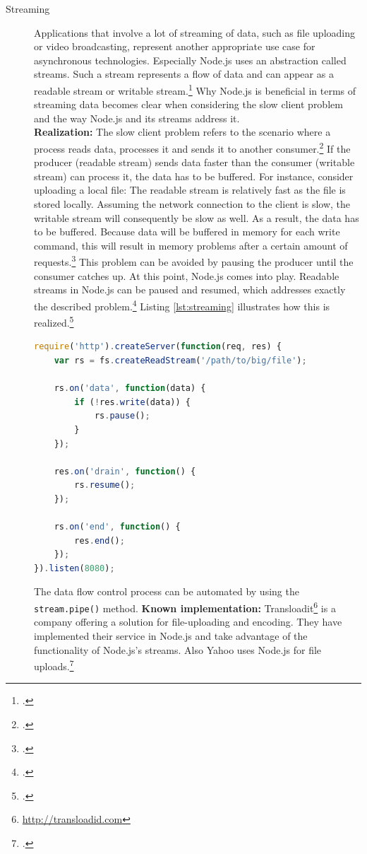 \begin{description}
   \item[Streaming] Applications that involve a lot of streaming of data, such
   as file uploading or video broadcasting, represent another appropriate use
   case for asynchronous technologies. Especially Node.js uses an abstraction
   called streams. Such a stream represents a flow of data and can appear as a
   readable stream or writable stream.\footcite[Cf.][75]{teixeira_2012} Why
   Node.js is beneficial in terms of streaming data becomes clear when
   considering the slow client problem and the way Node.js and its streams
   address it.\\
  \textbf{Realization:} The slow client problem refers to the scenario where a
  process reads data, processes it and sends it to another consumer.\footcite[Cf.][80]{teixeira_2012}
  If the producer (readable stream) sends data faster than the consumer (writable stream)
  can process it, the data has to be buffered. For instance, consider uploading
  a local file: The readable stream is relatively fast as the file is stored locally.
  Assuming the network connection to the client is slow, the writable stream will consequently
  be slow as well. As a result, the data has to be buffered. Because data will be buffered in
  memory for each write command, this will result in memory problems after a certain amount of
  requests.\footcite[Cf.][81]{teixeira_2012} This problem can be avoided by pausing the producer 
  until the consumer catches up. At this point, Node.js comes into play. Readable streams 
  in Node.js can be paused and resumed, which addresses exactly the described 
  problem.\footcite[Cf.][81]{teixeira_2012} Listing \ref{lst:streaming} illustrates 
  how this is realized.\footcite[Cf.][81]{teixeira_2012}
  \item[]

\begin{lstlisting}[language=javascript,caption={Controlling streams in Node.js},label=lst:streaming]
require('http').createServer(function(req, res) {
	var rs = fs.createReadStream('/path/to/big/file');
	
	rs.on('data', function(data) {
		if (!res.write(data)) {
			rs.pause();
		}
	});

	res.on('drain', function() {
		rs.resume();
	});

	rs.on('end', function() {
		res.end();
	});
}).listen(8080);
\end{lstlisting}


The data flow control process can be automated by using the \texttt{stream.pipe()} method. 
  \textbf{Known implementation:} Transloadit\footnote{\url{http://transloadid.com}} is a company offering a solution for file-uploading and encoding. They have implemented their service in Node.js and take advantage of the functionality of Node.js’s streams. Also Yahoo uses Node.js for file uploads.\footcite[Cf.][]{Odell_2012} 


\end{description}
